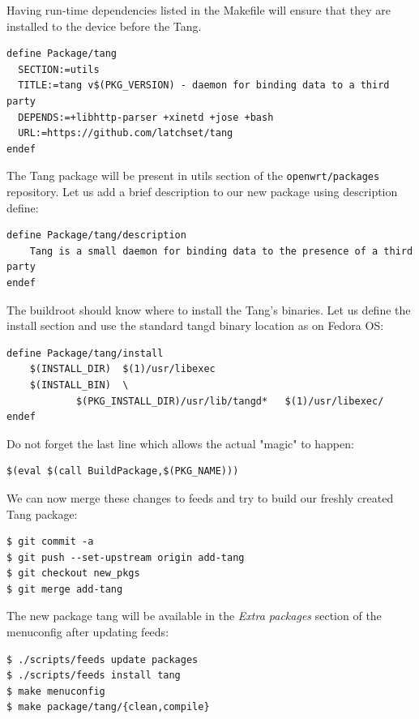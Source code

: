 Having run-time dependencies listed in the Makefile will ensure that they are installed to the device before the Tang.
\begin{lstlisting}[columns=fixed,basicstyle=\ttfamily\footnotesize,tabsize=4,backgroundcolor=\color{yellow!10}]
define Package/tang
  SECTION:=utils
  TITLE:=tang v$(PKG_VERSION) - daemon for binding data to a third party
  DEPENDS:=+libhttp-parser +xinetd +jose +bash
  URL:=https://github.com/latchset/tang
endef
\end{lstlisting}
The Tang package will be present in utils section of the {\tt openwrt/packages} repository.
Let us add a brief description to our new package using description define:
\begin{lstlisting}[columns=fixed,basicstyle=\ttfamily\footnotesize,tabsize=4,backgroundcolor=\color{yellow!10}]
define Package/tang/description
	Tang is a small daemon for binding data to the presence of a third party
endef
\end{lstlisting}
The buildroot should know where to install the Tang's binaries.
Let us define the install section and use the standard tangd binary location as on Fedora OS:
\begin{lstlisting}[columns=fixed,basicstyle=\ttfamily\footnotesize,tabsize=4,backgroundcolor=\color{yellow!10}]
define Package/tang/install
	$(INSTALL_DIR)	$(1)/usr/libexec
	$(INSTALL_BIN)	\
			$(PKG_INSTALL_DIR)/usr/lib/tangd*	$(1)/usr/libexec/
endef
\end{lstlisting}
Do not forget the last line which allows the actual "magic" to happen:
\begin{lstlisting}[columns=fixed,basicstyle=\ttfamily\footnotesize,tabsize=4,backgroundcolor=\color{yellow!10}]
$(eval $(call BuildPackage,$(PKG_NAME)))
\end{lstlisting}
We can now merge these changes to feeds and try to build our freshly created Tang package:
\begin{lstlisting}[columns=fixed,basicstyle=\ttfamily\footnotesize,tabsize=4,backgroundcolor=\color{yellow!10}]
$ git commit -a
$ git push --set-upstream origin add-tang
$ git checkout new_pkgs
$ git merge add-tang
\end{lstlisting}
The new package tang will be available in the {\it Extra packages} section of the menuconfig after updating feeds:
\begin{lstlisting}[columns=fixed,basicstyle=\ttfamily\footnotesize,tabsize=4,backgroundcolor=\color{yellow!10}]
$ ./scripts/feeds update packages
$ ./scripts/feeds install tang
$ make menuconfig
$ make package/tang/{clean,compile}
\end{lstlisting}
